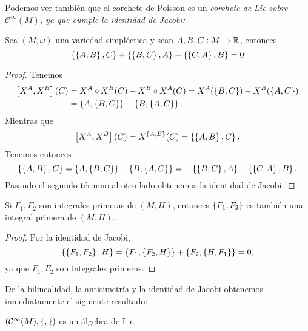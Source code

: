 Podemos ver también que el corchete de Poisson es un \em corchete de Lie sobre \em $\mathcal{C}^{\infty}(M)$, ya que cumple la identidad de Jacobi:
\begin{prop}
 Sea $(M,\omega)$ una variedad simpléctica y sean  $A,B,C:M \rightarrow \mathbb{R}$, entonces
 \begin{equation*}
   \left\lbrace\left\lbrace A,B\right\rbrace,C\right\rbrace+ \left\lbrace\left\lbrace B,C\right\rbrace,A\right\rbrace + \left\lbrace\left\lbrace C,A\right\rbrace,B\right\rbrace=0
 \end{equation*}
 \begin{proof}
   Tenemos 
   \begin{align*}
     \left[X^A,X^B\right] (C) & = X^A\circ X^B (C) - X^B\circ X^A (C)  = X^A(\left\lbrace B,C\right\rbrace)-X^B(\left\lbrace A,C\right\rbrace) \\
     &= \left\lbrace A,\left\lbrace B,C\right\rbrace\right\rbrace-\left\lbrace B,\left\lbrace A,C\right\rbrace\right\rbrace.
   \end{align*}
   Mientras que
   \begin{equation*}
     \left[X^A,X^B\right](C)=X^{\left\lbrace A,B\right\rbrace}(C)=\left\lbrace\left\lbrace A,B\right\rbrace,C\right\rbrace.
   \end{equation*}
   Tenemos entonces
   \begin{equation*}
     \left\lbrace\left\lbrace A,B\right\rbrace,C\right\rbrace=\left\lbrace A,\left\lbrace B,C\right\rbrace\right\rbrace-\left\lbrace B,\left\lbrace A,C\right\rbrace\right\rbrace=-\left\lbrace\left\lbrace B,C\right\rbrace,A\right\rbrace-\left\lbrace\left\lbrace C,A\right\rbrace,B\right\rbrace.
   \end{equation*}
   Pasando el segundo término al otro lado obtenemos la identidad de Jacobi.
 \end{proof}
\end{prop}
\begin{corol}
  Si $F_1, F_2$ son integrales primeras de $(M,H)$, entonces $\left\lbrace F_1,F_2\right\rbrace$ es también una integral primera de $(M,H)$.
\end{corol}
\begin{proof}
  Por la identidad de Jacobi,
  \begin{equation*}
    \left\lbrace \left\lbrace F_1,F_2\right\rbrace, H\right\rbrace= \left\lbrace F_1, \left\lbrace F_2,H\right\rbrace\right\rbrace + \left\lbrace F_2, \left\lbrace H,F_1\right\rbrace \right\rbrace=0,
  \end{equation*}
  ya que $F_1,F_2$ son integrales primeras.
\end{proof}

De la bilinealidad, la antisimetría y la identidad de Jacobi obtenemos inmediatamente el siguiente resultado:
\begin{corol}
  $(\mathcal{C}^{\infty}(M),\left\lbrace , \right\rbrace)$ es un álgebra de Lie.  
\end{corol}

